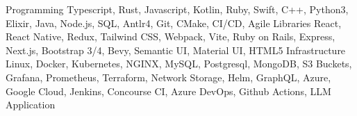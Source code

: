 \begin{cvskills}
  \cvskill
    {Programming}
    {Typescript, Rust, Javascript, Kotlin, Ruby, Swift, C++, Python3, Elixir, Java, Node.js, SQL, Antlr4, Git, CMake, CI/CD, Agile}
  \cvskill
    {Libraries}
    {React, React Native, Redux, Tailwind CSS, Webpack, Vite, Ruby on Rails, Express, Next.js, Bootstrap 3/4, Bevy, Semantic UI, Material UI, HTML5}
  \cvskill
    {Infrastructure}
    {Linux, Docker, Kubernetes, NGINX, MySQL, Postgresql, MongoDB, S3 Buckets, Grafana, Prometheus, Terraform, Network Storage, Helm, GraphQL, Azure, Google Cloud, Jenkins, Concourse CI, Azure DevOps, Github Actions, LLM Application}
\end{cvskills}
